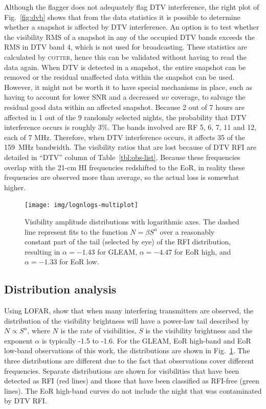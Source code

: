\documentclass{pasa}
\begin{document}
Although the flagger does not adequately flag DTV interference, the right plot of Fig.~\ref{fig:dvb} shows that from the data statistics it is possible to determine whether a snapshot is affected by DTV interference. An option is to test whether the visibility RMS of a snapshot in any of the occupied DTV bands exceeds the RMS in DTV band 4, which is not used for broadcasting. These statistics are calculated by \textsc{cotter}, hence this can be validated without having to read the data again. When DTV is detected in a snapshot, the entire snapshot can be removed or the residual unaffected data within the snapshot can be used. However, it might not be worth it to have special mechanisms in place, such as having to account for lower SNR and a decreased $uv$ coverage, to salvage the residual good data within an affected snapshot. Because 2 out of 7 hours are affected in 1 out of the 9 randomly selected nights, the probability that DTV interference occurs is roughly 3\%. The bands involved are RF 5, 6, 7, 11 and 12, each of 7 MHz. Therefore, when DTV interference occurs, it affects 35 of the 159~MHz bandwidth. The visibility ratios that are lost because of DTV RFI are detailed in ``DTV'' column of Table~\ref{tbl:obs-list}. Because these frequencies overlap with the 21-cm HI frequencies redshifted to the EoR, in reality these frequencies are observed more than average, so the actual loss is somewhat higher.

\noindent\begin{figure}
\begin{center}\hspace*{-0.2cm}\texttt{[image: img/lognlogs-multiplot]}
\caption{Visibility amplitude distributions with logarithmic axes. The dashed line represent fits to the function $N=\beta S^\alpha$ over a reasonably constant part of the tail (selected by eye) of the RFI distribution, resulting in $\alpha=-1.43$ for GLEAM, $\alpha=-4.47$ for EoR high, and $\alpha=-1.33$ for EoR low.}
\label{fig:lognlogs}
\end{center}
\end{figure}

\subsection{Distribution analysis}
Using LOFAR, \citet{offringa-rfi-distributions} show that when many interfering transmitters are observed, the distribution of the visibility brightness will have a power-law tail described by $N\propto S^\alpha$, where $N$ is the rate of visibilities, $S$ is the visibility brightness and the exponent $\alpha$ is typically -1.5 to -1.6. For the GLEAM, EoR high-band and EoR low-band observations of this work, the distributions are shown in Fig.~\ref{fig:lognlogs}. The three distributions are different due to the fact that observations cover different frequencies.  Separate distributions are shown for visibilities that have been detected as RFI (red lines) and those that have been classified as RFI-free (green lines). The EoR high-band curves do not include the night that was contaminated by DTV RFI.
\end{document}
